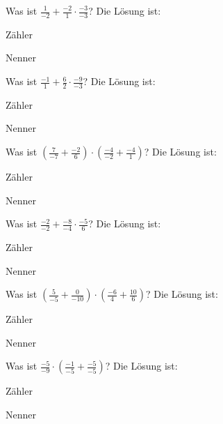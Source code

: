 \documentclass{ximera}
\begin{document}
\begin{shuffle}


\begin{question}
Was ist $\frac{1}{-2}+\frac{-2}{1}\cdot\frac{-3}{-3}$?
Die Lösung ist:
\begin{solution}
Zähler 
\end{solution}
\begin{solution}
Nenner 
\end{solution}
\end{question}


\begin{question}
Was ist $\frac{-1}{1}+\frac{6}{2}\cdot\frac{-9}{-3}$?
Die Lösung ist:
\begin{solution}
Zähler 
\end{solution}
\begin{solution}
Nenner 
\end{solution}
\end{question}


\begin{question}
Was ist $(\frac{7}{-7}+\frac{-2}{6})\cdot(\frac{-4}{-2}+\frac{-4}{1})$?
Die Lösung ist:
\begin{solution}
Zähler 
\end{solution}
\begin{solution}
Nenner 
\end{solution}
\end{question}


\begin{question}
Was ist $\frac{-2}{-2}+\frac{-8}{-4}\cdot\frac{-5}{6}$?
Die Lösung ist:
\begin{solution}
Zähler 
\end{solution}
\begin{solution}
Nenner 
\end{solution}
\end{question}


\begin{question}
Was ist $(\frac{5}{-5}+\frac{0}{-10})\cdot(\frac{-6}{4}+\frac{10}{6})$?
Die Lösung ist:
\begin{solution}
Zähler 
\end{solution}
\begin{solution}
Nenner 
\end{solution}
\end{question}


\begin{question}
Was ist $\frac{-5}{-9}\cdot(\frac{-1}{-5}+\frac{-5}{-5})$?
Die Lösung ist:
\begin{solution}
Zähler 
\end{solution}
\begin{solution}
Nenner 
\end{solution}
\end{question}



\end{shuffle}
\end{document}
